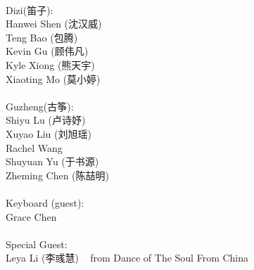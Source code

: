 \documentclass[letter,6pt,poets]{ConcProg}
\begin{document}
\begin{multicols}{2}
\\
Dizi(笛子): 				 \\    
Hanwei Shen		(沈汉威)     \\
Teng Bao (包腾)\\
Kevin Gu   (顾伟凡)               \\
Kyle Xiong (熊天宇)\\
Xiaoting Mo (莫小婷)\\
\\
Guzheng(古筝):\\
Shiyu Lu (卢诗妤)\\
Xuyao Liu (刘旭瑶)\\               
Rachel Wang \\
Shuyuan Yu  (于书源)\\
Zheming Chen (陈喆明)\\
\\
Keyboard (guest):\\
Grace Chen
\\
\\
Special Guest:\\
Leya Li (李彧慧)
 \ \small{ from Dance of The Soul From China}
\\
\end{multicols}
\end{document}

